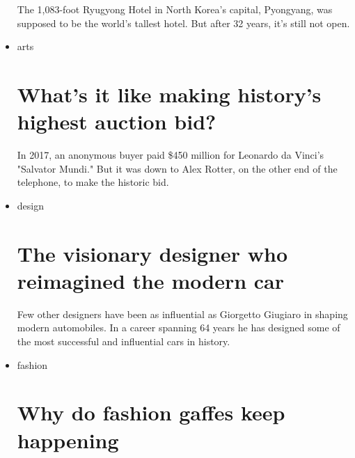 \begin{itemize}
  \href{/style/article/ryugyong-hotel-architecture-origins/index.html}{}

  The 1,083-foot Ryugyong Hotel in North Korea's capital, Pyongyang, was
  supposed to be the world's tallest hotel. But after 32 years, it's
  still not open.
\item
  \href{/style/arts}{}

  arts

  \href{/style/article/alex-rotter-christies-auction/index.html}{}

  \hypertarget{whats-it-like-making-historys-highest-auction-bid}{%
  \section{What's it like making history's highest auction
  bid?}\label{whats-it-like-making-historys-highest-auction-bid}}

  \href{/style/article/alex-rotter-christies-auction/index.html}{}

  In 2017, an anonymous buyer paid \$450 million for Leonardo da Vinci's
  "Salvator Mundi." But it was down to Alex Rotter, on the other end of
  the telephone, to make the historic bid.
\item
  \href{/style/design}{}

  design

  \href{/style/article/giorgetto-giugiaro-interview/index.html}{}

  \hypertarget{the-visionary-designer-who-reimagined-the-modern-car}{%
  \section{The visionary designer who reimagined the modern
  car}\label{the-visionary-designer-who-reimagined-the-modern-car}}

  \href{/style/article/giorgetto-giugiaro-interview/index.html}{}

  Few other designers have been as influential as Giorgetto Giugiaro in
  shaping modern automobiles. In a career spanning 64 years he has
  designed some of the most successful and influential cars in history.
\item
  \href{/style/fashion}{}

  fashion

  \href{/style/article/fashion-gaffes-industry-diversity-problem/index.html}{}

  \hypertarget{why-do-fashion-gaffes-keep-happening}{%
  \section{Why do fashion gaffes keep
  happening}\label{why-do-fashion-gaffes-keep-happening}}


\end{itemize}

